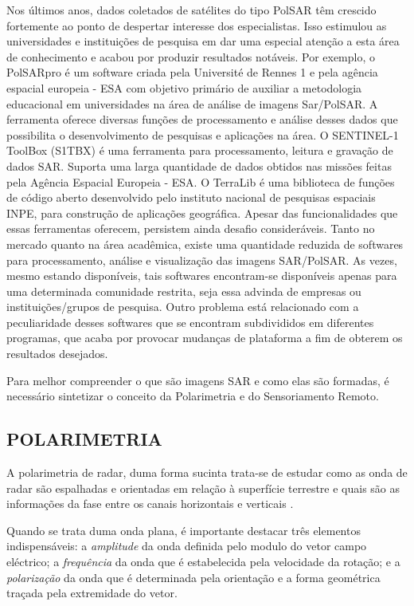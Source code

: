 \documentclass[a4paper,12pt]{article}
\begin{document}
Nos últimos anos, dados coletados de satélites do tipo PolSAR têm crescido fortemente ao ponto de despertar interesse dos especialistas. Isso estimulou as universidades e instituições de pesquisa em dar uma especial atenção a esta área de conhecimento e acabou por produzir resultados notáveis.
Por exemplo, o PolSARpro é um software criada pela Université de Rennes 1 e pela agência espacial europeia - ESA com objetivo primário de auxiliar a metodologia educacional em universidades na área de análise de imagens Sar/PolSAR. A ferramenta oferece diversas funções de processamento e análise desses dados que possibilita o desenvolvimento de pesquisas e aplicações na área. O SENTINEL-1 ToolBox (S1TBX) é uma ferramenta para processamento, leitura e gravação de dados SAR. Suporta uma larga quantidade de dados obtidos nas missões feitas pela Agência Espacial Europeia - ESA. O TerraLib é uma biblioteca de funções de código aberto desenvolvido pelo instituto nacional de pesquisas espaciais INPE, para construção de aplicações geográfica. Apesar das funcionalidades que essas ferramentas oferecem, persistem ainda desafio consideráveis. Tanto no mercado quanto na área acadêmica, existe uma quantidade reduzida de softwares para processamento, análise e visualização das imagens SAR/PolSAR. As vezes, mesmo estando disponíveis, tais softwares encontram-se disponíveis apenas para uma determinada comunidade restrita, seja essa advinda de empresas ou instituições/grupos de pesquisa. Outro problema está relacionado com a peculiaridade desses softwares que se encontram subdivididos em diferentes programas, que acaba por provocar mudanças de plataforma a fim de obterem os resultados desejados.

Para melhor compreender o que são imagens SAR e como elas são formadas, é necessário sintetizar o conceito da Polarimetria e do Sensoriamento Remoto.

\subsection{POLARIMETRIA}
\label{subsec:Pol}

A polarimetria de radar, duma forma sucinta trata-se de estudar como as onda de radar são espalhadas e orientadas em relação à superfície terrestre e quais são as informações da fase entre os canais horizontais e verticais \cite{nilosergio2012}.

Quando se trata duma onda plana, é importante destacar três elementos indispensáveis: a \textit{amplitude} da onda definida pelo modulo do vetor campo eléctrico; a \textit{frequência} da onda que é estabelecida pela velocidade da rotação; e a \textit{polarização} da onda que é determinada pela orientação e a forma geométrica traçada pela extremidade do vetor.
\end{document}
